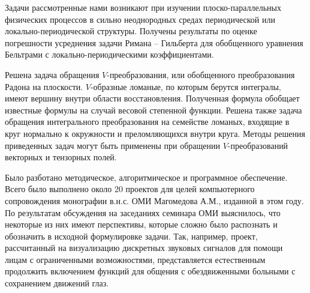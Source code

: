 Задачи рассмотренные нами возникают при изучении плоско-парал\-лельных физических процессов в сильно неоднородных
 средах периодической или локально-периодической структуры.
Получены результаты по оценке погрешности усреднения задачи Римана -- Гильберта для обобщенного уравнения Бельтрами
 с локально-периодическими коэффициентами.



Решена задача обращения $V$-преобразования, или обобщенного преобразования Радона на плоскости. $V$-образные ломаные, по которым берутся интегралы, имеют вершину внутри области восстановления. Полученная формула обобщает известные формулы на случай весовой степенной функции.  Решена также задача обращения интегрального преобразования на семействе ломаных, входящие в круг нормально к окружности и преломляющихся внутри круга.
Методы решения приведенных задач могут быть применены при обращении $V$-преобразований векторных и тензорных полей.



Было разботано методическое, алгоритмическое и программное обеспечение. Всего было выполнено около 20 проектов для целей компьютерного сопровождения монографии в.н.с. ОМИ Магомедова А.М., изданной в этом году. По результатам обсуждения на заседаниях семинара ОМИ выяснилось, что некоторые из них имеют перспективы, которые сложно было распознать и обозначить в исходной формулировке задачи. Так, например, проект, рассчитанный на визуализацию дискретных звуковых сигналов для помощи лицам с ограниченными возможностями, представляется естественным продолжить включением функций для общения с обездвиженными больными с сохранением движений глаз.


